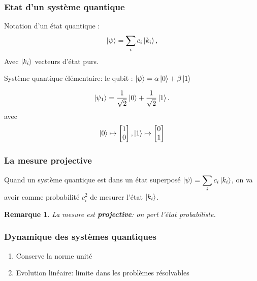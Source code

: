 \documentclass{beamer}
\newtheorem{rem}{Remarque}
\begin{document}
\begin{frame}
\frametitle{Etat d'un système quantique}

\begin{definition}
  Notation d'un état quantique :
\begin{equation}
    \ket{\psi} = \displaystyle\sum_{i} c_i \ket{k_i},
\end{equation}
Avec $\ket{k_i}$ vecteurs d'état purs.
\end{definition}

% 

Système quantique élémentaire: le qubit : $\ket{\psi} = \alpha \ket{0} + \beta \ket{1}$

\begin{example}
\begin{equation}
  \ket{\psi_1} = \frac{1}{\sqrt{2}} \ket{0} + \frac{1}{\sqrt{2}} \ket{1}.
\end{equation}
avec
\begin{equation}
  \ket{0} \mapsto \begin{bmatrix}
    1 \\ 0
  \end{bmatrix}
  ,
  \ket{1} \mapsto \begin{bmatrix}
    0 \\ 1
  \end{bmatrix}
\end{equation}
\end{example}

\end{frame}

\begin{frame}
\frametitle{La mesure projective}
\begin{definition}
  Quand un système quantique est dans un état superposé $\ket{\psi} = \displaystyle\sum_{i} c_i \ket{k_i}$, on va avoir comme probabilité $c_i^2$ de mesurer l'état $\ket{k_i}$.
\end{definition}

\begin{rem}
  La mesure est \textbf{projective}: on pert l'état probabiliste.
\end{rem}
\end{frame}



\begin{frame}
\frametitle{Dynamique des systèmes quantiques}
\begin{enumerate}
  \item Conserve la norme unité
  \item Evolution linéaire: limite dans les problèmes résolvables
\end{enumerate}
\end{frame}
\end{document}

